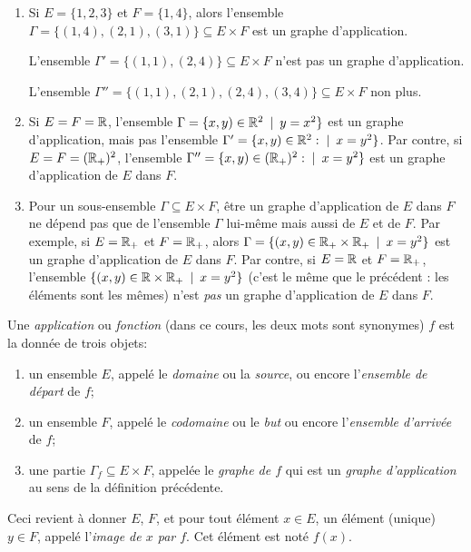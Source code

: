 \begin{exemple}
\begin{enumerate}
\item Si $E = \{1,2,3\}$ et $F = \{1,4\}$, alors l'ensemble $\Gamma = \{(1,4),(2,1),(3,1)\} \subseteq E\times F$ est un graphe d'application.

L'ensemble $\Gamma' = \{(1,1),(2,4)\} \subseteq E\times F$ n'est pas un graphe d'application.

L'ensemble $\Gamma'' = \{(1,1),(2,1),(2,4),(3,4)\} \subseteq E\times F$ non plus.
\item Si $E = F = \mathbb{R}$, l'ensemble $\Gamma = \{x,y)\in \R^2 \:\mid\: y=x^2\}$ est un graphe d'application, mais pas l'ensemble $\Gamma' = \{x,y)\in \R^2 :\mid\: x=y^2\}$. Par contre, si $E=F=(\mathbb{R}_+)^2$, l'ensemble  $\Gamma'' = \{x,y)\in (\R_+)^2 :\mid\: x=y^2\}$ est un graphe d'application de $E$ dans $F$.
\item Pour un sous-ensemble $\Gamma\subseteq E\times F$, être un graphe d'application de $E$ dans $F$ ne dépend pas que de l'ensemble $\Gamma$ lui-même mais aussi de $E$ et de $F$. Par exemple, si $E=\mathbb{R}_+$ et $F=\mathbb{R}_+$, alors $\Gamma = \{(x,y)\in \R_+\times \R_+ \:\mid\: x=y^2\}$ est un graphe d'application de $E$ dans $F$. Par contre, si $E=\mathbb{R}$ et $F=\mathbb{R}_+$, l'ensemble $\{(x,y)\in \R\times \R_+ \:\mid\: x=y^2\}$ (c'est le même que le précédent : les éléments sont les mêmes) n'est \emph{pas} un graphe d'application de $E$ dans $F$.
\end{enumerate}
\end{exemple}

\begin{definition}
Une \emph{application} ou \emph{fonction} (dans ce cours, les deux mots sont synonymes) $f$ est la donnée de trois objets:
\begin{enumerate}
\item un ensemble $E$, appelé le \emph{domaine} ou la \emph{source}, ou encore l'\emph{ensemble de départ} de $f$;
\item un ensemble $F$, appelé le \emph{codomaine} ou le \emph{but} ou encore l'\emph{ensemble d'arrivée} de $f$;
\item une partie $\Gamma_f \subseteq E\times F$, appelée le \emph{graphe de $f$} qui est un \emph{graphe d'application} au sens de la définition précédente. 
\end{enumerate}
Ceci revient à donner $E$, $F$, et pour tout élément $x \in E$, un élément (unique) $y\in F$, appelé l'\emph{image de $x$ par $f$}. Cet élément est noté $f(x)$.
\end{definition}

